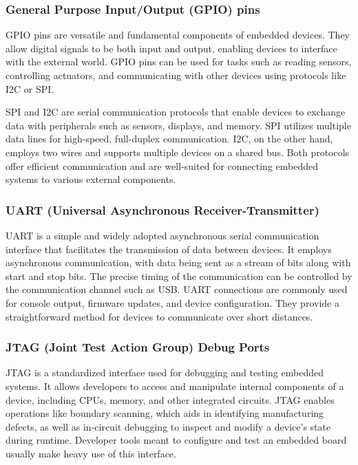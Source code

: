 \subsubsection{General Purpose Input/Output (GPIO) pins}

GPIO pins are versatile and fundamental components of embedded devices. They allow digital signals to be both input and output, enabling devices to interface with the external world. GPIO pins can be used for tasks such as reading sensors, controlling actuators, and communicating with other devices using protocols like I2C or SPI.

SPI and I2C are serial communication protocols that enable devices to exchange data with peripherals such as sensors, displays, and memory. SPI utilizes multiple data lines for high-speed, full-duplex communication. I2C, on the other hand, employs two wires and supports multiple devices on a shared bus. Both protocols offer efficient communication and are well-suited for connecting embedded systems to various external components.

\subsubsection{UART (Universal Asynchronous Receiver-Transmitter)}

UART is a simple and widely adopted asynchronous serial communication interface that facilitates the transmission of data between devices. It employs asynchronous communication, with data being sent as a stream of bits along with start and stop bits. The precise timing of the communication can be controlled by the communication channel such as USB. UART connections are commonly used for console output, firmware updates, and device configuration. They provide a straightforward method for devices to communicate over short distances.

\subsubsection{JTAG (Joint Test Action Group) Debug Ports}

JTAG is a standardized interface used for debugging and testing embedded systems. It allows developers to access and manipulate internal components of a device, including CPUs, memory, and other integrated circuits. JTAG enables operations like boundary scanning, which aids in identifying manufacturing defects, as well as in-circuit debugging to inspect and modify a device's state during runtime. Developer tools meant to configure and test an embedded board usually make heavy use of this interface.

